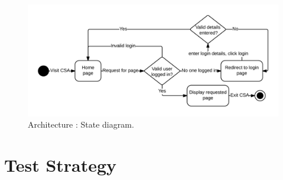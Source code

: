 \documentclass[10pt,a4paper,titlepage]{article}
\begin{document}
\begin{figure}[H]
\begin{center}
\includegraphics[scale=0.25]{include/State_Diagram.png}  
\caption{Architecture : State diagram. }
\label{fig:stateDiagram}
\end{center}
\end{figure}



\section{Test Strategy}
 
\end{document}
